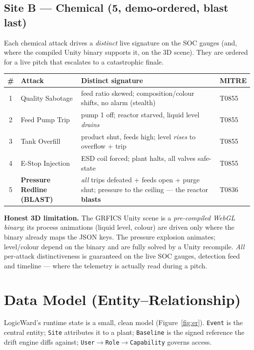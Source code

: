 \documentclass[11pt,a4paper]{article}
\newcommand{\code}[1]{\texttt{\small #1}}
\begin{document}
\subsection{Site B --- Chemical (5, demo-ordered, blast last)}
Each chemical attack drives a \emph{distinct} live signature on the SOC gauges (and, where the
compiled Unity binary supports it, on the 3D scene). They are ordered for a live pitch that
escalates to a catastrophic finale.

\begin{table}[h]\small\centering
\renewcommand{\arraystretch}{1.15}
\begin{tabularx}{\textwidth}{@{}c l L l@{}}
\toprule
\textbf{\#} & \textbf{Attack} & \textbf{Distinct signature} & \textbf{MITRE}\\
 & Quality Sabotage & feed ratio skewed; composition/colour shifts, no alarm (stealth) & T0855\\
2 & Feed Pump Trip & pump 1 off; reactor starved, liquid level \emph{drains} & T0855\\
3 & Tank Overfill & product shut, feeds high; level \emph{rises} to overflow + trip & T0855\\
4 & E-Stop Injection & ESD coil forced; plant halts, all valves safe-state & T0855\\
5 & \textbf{Pressure Redline (BLAST)} & \emph{all} trips defeated + feeds open + purge shut; pressure to the ceiling --- the reactor \textbf{blasts} & T0836\\
\bottomrule
\end{tabularx}
\end{table}

\begin{warnbox}
\textbf{Honest 3D limitation.} The GRFICS Unity scene is a \emph{pre-compiled WebGL binary}; its
process animations (liquid level, colour) are driven only where the binary already maps the JSON
keys. The pressure explosion animates; level/colour depend on the binary and are fully solved by a
Unity recompile. \emph{All} per-attack distinctiveness is guaranteed on the live SOC gauges,
detection feed and timeline --- where the telemetry is actually read during a pitch.
\end{warnbox}

\section{Data Model (Entity--Relationship)}
LogicWard's runtime state is a small, clean model (Figure~\ref{fig:er}). \code{Event} is the
central entity; \code{Site} attributes it to a plant; \code{Baseline} is the signed reference the
drift engine diffs against; \code{User}$\to$\code{Role}$\to$\code{Capability} governs access.
\end{document}
